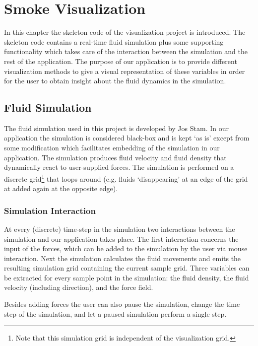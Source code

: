
\chapter{Smoke Visualization} %
\label{cha:skeleton_compilation}
In this chapter the skeleton code of the visualization project is introduced. The skeleton code contains a real-time fluid simulation plus some supporting functionality which takes care of the interaction between the simulation and the rest of the application. The purpose of our application is to provide different visualization methods to give a visual representation of these variables in order for the user to obtain insight about the fluid dynamics in the simulation. 

\section{Fluid Simulation} %
\label{sec:fluid_simulation}
The fluid simulation used in this project is developed by Jos Stam\cite{Simulation:Stam:2002}. In our application the simulation is considered black-box and is kept `as is' except from some modification which facilitates embedding of the simulation in our application. The simulation produces fluid velocity and fluid density that dynamically react to user-supplied forces. The simulation is performed on a discrete grid\footnote{Note that this simulation grid is independent of the visualization grid.} that loops around (e.g. fluids `disappearing' at an edge of the grid at added again at the opposite edge).

\subsection{Simulation Interaction} %
\label{sub:simulation_interaction}
At every (discrete) time-step in the simulation two interactions between the simulation and our application takes place. The first interaction concerns the input of the forces, which can be added to the simulation by the user via mouse interaction. Next the simulation calculates the fluid movements and emits the resulting simulation grid containing the current sample grid. Three variables can be extracted for every sample point in the simulation: the fluid density, the fluid velocity (including direction), and the force field.

Besides adding forces the user can also pause the simulation, change the time step of the simulation, and let a paused simulation perform a single step.

